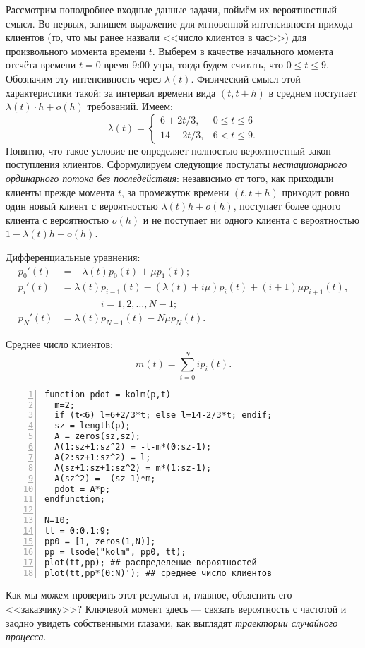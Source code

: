 \documentclass[14pt]{extarticle}
\theoremstyle{theorem}
\theoremstyle{remark}
\begin{document}
Рассмотрим поподробнее входные данные задачи, поймём их вероятностный
смысл. Во-первых, запишем выражение для мгновенной интенсивности прихода
клиентов (то, что мы ранее назвали <<число клиентов в час>>) для произвольного
момента времени $t$. Выберем в качестве начального момента отсчёта времени $t=0$
время 9:00 утра, тогда будем считать, что $0\leq t\leq 9$. Обозначим эту
интенсивность через $\lambda(t)$. Физический смысл этой характеристики такой: за
интервал времени вида $(t, t+h)$ в среднем поступает $\lambda(t)\cdot h+o(h)$
требований.  Имеем:
\[
\lambda(t)=\begin{cases}
  6+2t/3,& 0\leq t\leq 6\\
  14-2t/3,& 6< t \leq 9.
\end{cases}
\]
Понятно, что такое
условие не определяет полностью вероятностный закон поступления
клиентов. Сформулируем следующие постулаты \emph{нестационарного ординарного
  потока без последействия}: независимо от того, как приходили клиенты прежде
момента $t$, за промежуток времени $(t, t+h)$ приходит ровно один новый клиент с
вероятностью $\lambda(t)h+o(h)$, поступает более одного клиента с
вероятностью $o(h)$ и не поступает ни одного клиента с вероятностью
$1-\lambda(t)h+o(h)$. 

Дифференциальные уравнения: 
\begin{align*}
  p_0'(t) & = -\lambda(t)p_0(t)+\mu p_1(t);\\
  p_i'(t) & = \lambda(t)p_{i-1}(t)-(\lambda(t)+i\mu)p_i(t)+(i+1)\mu
  p_{i+1}(t),\\ & \qquad \qquad i=1, 2, \ldots, N-1;\\
  p_N'(t) & = \lambda(t)p_{N-1}(t)-N\mu p_N(t).
\end{align*}

Среднее число клиентов:
\[
m(t)=\sum_{i=0}^N i p_i(t).
\]
\begin{Verbatim}[frame=single,xleftmargin=2em,numbers=left]
function pdot = kolm(p,t)
  m=2;
  if (t<6) l=6+2/3*t; else l=14-2/3*t; endif;
  sz = length(p);
  A = zeros(sz,sz);
  A(1:sz+1:sz^2) = -l-m*(0:sz-1);
  A(2:sz+1:sz^2) = l;
  A(sz+1:sz+1:sz^2) = m*(1:sz-1);
  A(sz^2) = -(sz-1)*m;
  pdot = A*p;
endfunction;

N=10;
tt = 0:0.1:9;
pp0 = [1, zeros(1,N)];
pp = lsode("kolm", pp0, tt);
plot(tt,pp); ## распределение вероятностей
plot(tt,pp*(0:N)'); ## среднее число клиентов
\end{Verbatim}


Как мы можем проверить этот результат и, главное, объяснить его <<заказчику>>? 
Ключевой момент здесь --- связать вероятность с частотой и заодно увидеть
собственными глазами, как выглядят \emph{траектории случайного процесса}.
\end{document}
